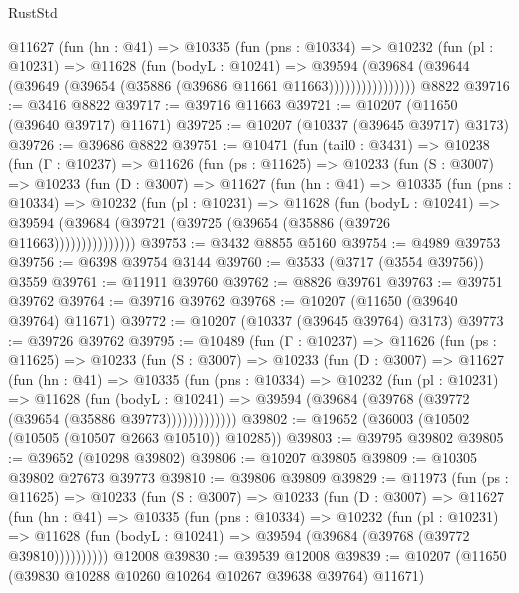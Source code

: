 \begin{lexlean}{RustStd}
\begin{coremodule}
              @11627
                (fun (hn : @41) =>
                @10335
                  (fun (pns : @10334) =>
                  @10232
                    (fun (pl : @10231) =>
                    @11628
                      (fun (bodyL : @10241) =>
                      @39594
                        (@39684
                          (@39644 (@39649 (@39654 (@35886 (@39686 @11661 @11663))))))))))))))))
    @8822
@39716 := @3416 @8822
@39717 := @39716 @11663
@39721 := @10207 (@11650 (@39640 @39717) @11671)
@39725 := @10207 (@10337 (@39645 @39717) @3173)
@39726 := @39686 @8822
@39751 := @10471
    (fun (tail0 : @3431) =>
    @10238
      (fun (Γ : @10237) =>
      @11626
        (fun (ps : @11625) =>
        @10233
          (fun (S : @3007) =>
          @10233
            (fun (D : @3007) =>
            @11627
              (fun (hn : @41) =>
              @10335
                (fun (pns : @10334) =>
                @10232
                  (fun (pl : @10231) =>
                  @11628
                    (fun (bodyL : @10241) =>
                    @39594 (@39684 (@39721 (@39725 (@39654 (@35886 (@39726 @11663)))))))))))))))
@39753 := @3432 @8855 @5160
@39754 := @4989 @39753
@39756 := @6398 @39754 @3144
@39760 := @3533 (@3717 (@3554 @39756)) @3559
@39761 := @11911 @39760
@39762 := @8826 @39761
@39763 := @39751 @39762
@39764 := @39716 @39762
@39768 := @10207 (@11650 (@39640 @39764) @11671)
@39772 := @10207 (@10337 (@39645 @39764) @3173)
@39773 := @39726 @39762
@39795 := @10489
    (fun (Γ : @10237) =>
    @11626
      (fun (ps : @11625) =>
      @10233
        (fun (S : @3007) =>
        @10233
          (fun (D : @3007) =>
          @11627
            (fun (hn : @41) =>
            @10335
              (fun (pns : @10334) =>
              @10232
                (fun (pl : @10231) =>
                @11628
                  (fun (bodyL : @10241) =>
                  @39594 (@39684 (@39768 (@39772 (@39654 (@35886 @39773)))))))))))))
@39802 := @19652 (@36003 (@10502 (@10505 (@10507 @2663 @10510)) @10285))
@39803 := @39795 @39802
@39805 := @39652 (@10298 @39802)
@39806 := @10207 @39805
@39809 := @10305 @39802 @27673 @39773
@39810 := @39806 @39809
@39829 := @11973
    (fun (ps : @11625) =>
    @10233
      (fun (S : @3007) =>
      @10233
        (fun (D : @3007) =>
        @11627
          (fun (hn : @41) =>
          @10335
            (fun (pns : @10334) =>
            @10232
              (fun (pl : @10231) =>
              @11628 (fun (bodyL : @10241) => @39594 (@39684 (@39768 (@39772 @39810))))))))))
    @12008
@39830 := @39539 @12008
@39839 := @10207 (@11650 (@39830 @10288 @10260 @10264 @10267 @39638 @39764) @11671)

\end{coremodule}
\end{lexlean}
